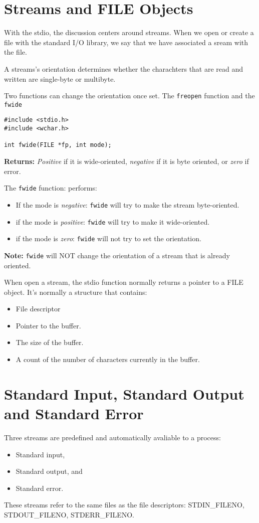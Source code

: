 \documentclass[a4paper,10pt]{book}
\begin{document}
\section{Streams and FILE Objects}
With the stdio, the discussion centers around streams. When we open or create a
file with the standard I/O library, we say that we have associated a sream with
the file.

A streams's orientation determines whether the charachters that are read and
written are single-byte or multibyte. 

Two functions can change the orientation once set. The \verb|freopen| function
and the \verb|fwide|

\begin{verbatim}
#include <stdio.h>
#include <wchar.h>

int fwide(FILE *fp, int mode);
\end{verbatim}

\textbf{Returns:} \emph{Positive} if it is wide-oriented, \emph{negative} if it is byte
oriented, or \emph{zero} if error.

The \verb|fwide| function: performs:
\begin{itemize}
\item If the mode is \emph{negative}: \verb|fwide| will try to make the stream
byte-oriented.
\item if the mode is \emph{positive}: \verb|fwide| will try to make it
wide-oriented.
\item if the mode is \emph{zero}: \verb|fwide| will not try to set the
orientation.
\end{itemize}

\textbf{Note:} \verb|fwide| will NOT change the orientation of a stream that is
already oriented.

When open a stream, the stdio function normally returns a pointer to a FILE
object. It's normally a structure that contains:
\begin{itemize}
\item File descriptor
\item Pointer to the buffer.
\item The size of the buffer.
\item A count of the number of characters currently in the buffer. 
\end{itemize}

\section{Standard Input, Standard Output and Standard Error}
Three streams are predefined and automatically avaliable to a process:
\begin{itemize}
\item Standard input,
\item Standard output, and 
\item Standard error.
\end{itemize}
These streams refer to the same files as the file descriptors: STDIN\_FILENO,
STDOUT\_FILENO, STDERR\_FILENO.
\end{document}

